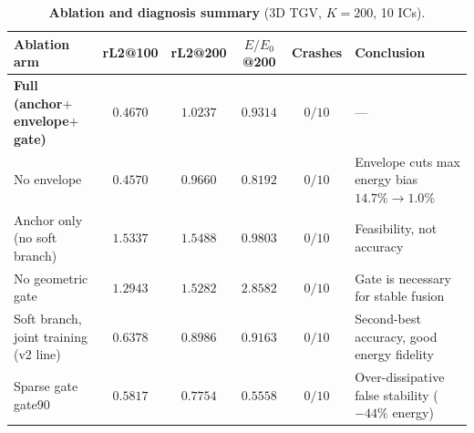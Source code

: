 \documentclass[11pt,a4paper]{article}
\begin{document}
\begin{table}[htbp]
\centering\small
\caption{\textbf{Ablation and diagnosis summary} (3D TGV, $K{=}200$, 10 ICs).}
\label{tab:ablation}
\setlength{\tabcolsep}{3pt}
\begin{tabular}{@{}lcccc>{\raggedright\arraybackslash}p{4.6cm}@{}}
\toprule
Ablation arm & rL2@100 & rL2@200 & $E/E_0$@200 & Crashes & Conclusion \\
\midrule
\textbf{Full (anchor$+$envelope$+$gate)} & $\bm{0.4670}$ & $1.0237$ & $\bm{0.9314}$ & $0/10$ & --- \\
No envelope & $0.4570$ & $\bm{0.9660}$ & $0.8192$ & $0/10$ & Envelope cuts max energy bias $14.7\%{\to}1.0\%$ \\
Anchor only (no soft branch) & $1.5337$ & $1.5488$ & $0.9803$ & $0/10$ & Feasibility, not accuracy \\
No geometric gate & $1.2943$ & $1.5282$ & $2.8582$ & $0/10$ & Gate is necessary for stable fusion \\
Soft branch, joint training (v2 line) & $0.6378$ & $0.8986$ & $0.9163$ & $0/10$ & Second-best accuracy, good energy fidelity \\
Sparse gate gate90 & $0.5817$ & $0.7754$ & $0.5558$ & $0/10$ & Over-dissipative false stability ($-44\%$ energy) \\
\bottomrule
\end{tabular}
\end{table}
\end{document}
